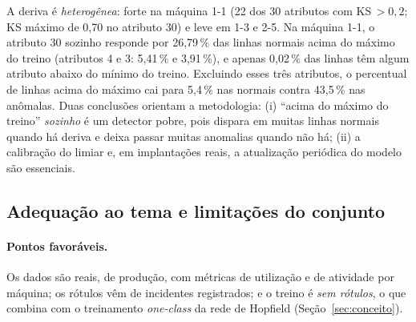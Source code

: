 A deriva é \emph{heterogênea}: forte na máquina 1-1 (22 dos 30 atributos com KS\,$>0{,}2$; KS máximo de 0,70 no
atributo 30) e leve em 1-3 e 2-5. Na máquina 1-1, o atributo 30 sozinho responde por 26,79\,\% das linhas normais
acima do máximo do treino (atributos 4 e 3: 5,41\,\% e 3,91\,\%), e apenas 0,02\,\% das linhas têm algum atributo
abaixo do mínimo do treino. Excluindo esses três atributos, o percentual de linhas acima do máximo cai para
5,4\,\% nas normais contra 43,5\,\% nas anômalas. Duas conclusões orientam a metodologia: (i) ``acima do máximo
do treino'' \emph{sozinho} é um detector pobre, pois dispara em muitas linhas normais quando há deriva e deixa
passar muitas anomalias quando não há; (ii) a calibração do limiar e, em implantações reais, a atualização
periódica do modelo são essenciais.

\subsection{Adequação ao tema e limitações do conjunto}\label{sec:adequacao}
\paragraph{Pontos favoráveis.} Os dados são reais, de produção, com métricas de utilização e de atividade
por máquina; os rótulos vêm de incidentes registrados; e o treino é \emph{sem rótulos}, o que combina com o
treinamento \emph{one-class} da rede de Hopfield (Seção~\ref{sec:conceito}).


